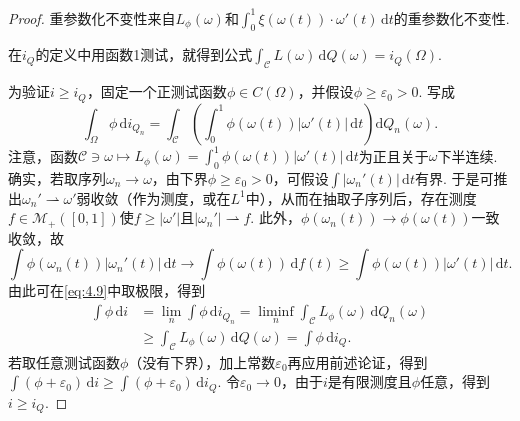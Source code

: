\begin{proof}
重参数化不变性来自$L_\phi(\omega)$和$\int_0^1\xi(\omega(t))\cdot\omega'(t)\,\mathrm dt$的重参数化不变性.

在$i_Q$的定义中用函数1测试，就得到公式$\int_{\mathscr C}L(\omega)\,\mathrm dQ(\omega)=i_Q(\Omega)$.

为验证$i\geq i_Q$，固定一个正测试函数$\phi\in C(\Omega)$，并假设$\phi\geq\varepsilon_0>0$. 写成
\begin{equation}\label{eq:4.9}
 \int_\Omega\phi\,\mathrm di_{Q_n}
 =\int_{\mathscr C}\left(\int_0^1\phi(\omega(t))|\omega'(t)|\,\mathrm dt\right)\mathrm dQ_n(\omega).
\end{equation}
注意，函数$\mathscr C\ni\omega\mapsto L_\phi(\omega)=\int_0^1\phi(\omega(t))|\omega'(t)|\,\mathrm dt$为正且关于$\omega$下半连续. 确实，若取序列$\omega_n\to\omega$，由下界$\phi\geq\varepsilon_0>0$，可假设$\int|\omega_n'(t)|\,\mathrm dt$有界. 于是可推出$\omega_n'\rightharpoonup\omega'$弱收敛（作为测度，或在$L^1$中），从而在抽取子序列后，存在测度$f\in\mathscr M_+([0,1])$使$f\geq|\omega'|$且$|\omega_n'|\rightharpoonup f$. 此外，$\phi(\omega_n(t))\to\phi(\omega(t))$一致收敛，故
\[
 \int\phi(\omega_n(t))|\omega_n'(t)|\,\mathrm dt
 \to\int\phi(\omega(t))\,\mathrm df(t)
 \geq\int\phi(\omega(t))|\omega'(t)|\,\mathrm dt.
\]
由此可在\eqref{eq:4.9}中取极限，得到
\begin{equation*}
\begin{aligned}
 \int\phi\,\mathrm di
 &=\lim_n\int\phi\,\mathrm di_{Q_n}
  =\liminf_n\int_{\mathscr C}L_\phi(\omega)\,\mathrm dQ_n(\omega)\\
 &\geq\int_{\mathscr C}L_\phi(\omega)\,\mathrm dQ(\omega)
  =\int\phi\,\mathrm di_Q.
\end{aligned}
\end{equation*}
若取任意测试函数$\phi$（没有下界），加上常数$\varepsilon_0$再应用前述论证，得到$\int(\phi+\varepsilon_0)\,\mathrm di\geq\int(\phi+\varepsilon_0)\,\mathrm di_Q$. 令$\varepsilon_0\to0$，由于$i$是有限测度且$\phi$任意，得到$i\geq i_Q$.


\end{proof}
